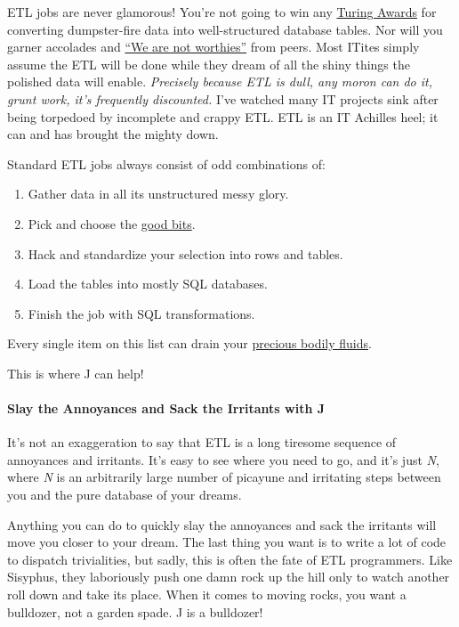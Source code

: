    ETL jobs are never glamorous! You're not going to win any
\href{https://amturing.acm.org/}{Turing Awards} for converting
dumpster-fire data into well-structured database tables. Nor will you
garner accolades and
\href{https://www.youtube.com/watch?v=jjaqrPpdQYc}{``We are not
worthies''} from peers. Most ITites simply assume the ETL will be done
while they dream of all the shiny things the polished data will enable.
\emph{Precisely because ETL is dull, any moron can do it, grunt work,
it's frequently discounted.} I've watched many IT projects sink after
being torpedoed by incomplete and crappy ETL. ETL is an IT Achilles
heel; it can and has brought the mighty down.

Standard ETL jobs always consist of odd combinations of:

\begin{enumerate}
\def\labelenumi{\arabic{enumi}.}
\tightlist
\item
  Gather data in all its unstructured messy glory.
\item
  Pick and choose the
  \href{https://www.youtube.com/watch?v=wPiHQ37gXnE}{good bits}.
\item
  Hack and standardize your selection into rows and tables.
\item
  Load the tables into mostly SQL databases.
\item
  Finish the job with SQL transformations.
\end{enumerate}

Every single item on this list can drain your
\href{https://www.youtube.com/watch?v=N1KvgtEnABY}{precious bodily
fluids}.

This is where J can help!

    \hypertarget{slay-the-annoyances-and-sack-the-irritants-with-j}{%
\paragraph{Slay the Annoyances and Sack the Irritants with
J}\label{slay-the-annoyances-and-sack-the-irritants-with-j}}

    It's not an exaggeration to say that ETL is a long tiresome sequence of
annoyances and irritants. It's easy to see where you need to go, and
it's just \emph{N}, where \emph{N} is an arbitrarily large number of
picayune and irritating steps between you and the pure database of your
dreams.

Anything you can do to quickly slay the annoyances and sack the
irritants will move you closer to your dream. The last thing you want is
to write a lot of code to dispatch trivialities, but sadly, this is
often the fate of ETL programmers. Like Sisyphus, they laboriously push
one damn rock up the hill only to watch another roll down and take its
place. When it comes to moving rocks, you want a bulldozer, not a garden
spade. J is a bulldozer!

